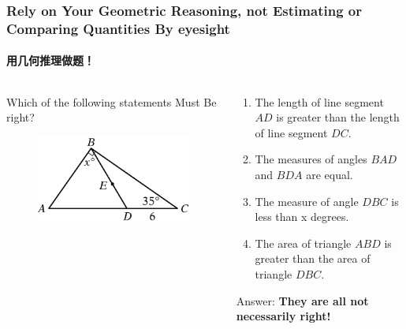 \documentclass[
	11pt, %
]{beamer}
\begin{document}

\begin{frame}
	\frametitle{Rely on Your Geometric Reasoning, not Estimating or Comparing Quantities By eyesight} %
	\framesubtitle{用几何推理做题！}
	\begin{columns}[t] 
		\begin{column}{0.4\textwidth} %
		Which of the following statements \alert{Must Be} right?
			\begin{figure}
				\includegraphics[width=\linewidth]{Not_Scale.jpg}
			\end{figure}
		\end{column}

	\begin{column}{0.6\textwidth} %
	\begin{enumerate}
		\item The length of line segment $AD$ is greater than the length of line segment $DC$.
		\item The measures of angles $BAD$ and $BDA$ are equal.
		\item The measure of angle $DBC$ is less than x degrees.
		\item The area of triangle $ABD$ is greater than the area of triangle $DBC$.
	\end{enumerate}
	\pause
	Answer: \textbf{\alert{They are all not necessarily right!}}
	\end{column}
	\end{columns}
\end{frame}


\end{document}

